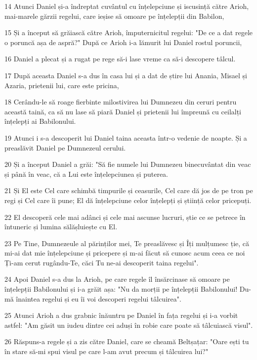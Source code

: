 \par 14 Atunci Daniel și-a îndreptat cuvântul cu înțelepciune și iscusință către Arioh, mai-marele gărzii regelui, care ieșise să omoare pe înțelepții din Babilon,
\par 15 Și a început să grăiască către Arioh, împuternicitul regelui: "De ce a dat regele o poruncă așa de aspră?" După ce Arioh i-a lămurit lui Daniel rostul poruncii,
\par 16 Daniel a plecat și a rugat pe rege să-i lase vreme ca să-i descopere tâlcul.
\par 17 După aceasta Daniel s-a dus în casa lui și a dat de știre lui Anania, Misael și Azaria, prietenii lui, care este pricina,
\par 18 Cerându-le să roage fierbinte milostivirea lui Dumnezeu din ceruri pentru această taină, ca să nu lase să piară Daniel și prietenii lui împreună cu ceilalți înțelepți ai Babilonului.
\par 19 Atunci i s-a descoperit lui Daniel taina aceasta într-o vedenie de noapte. Și a preaslăvit Daniel pe Dumnezeul cerului.
\par 20 Și a început Daniel a grăi: "Să fie numele lui Dumnezeu binecuvântat din veac și până în veac, că a Lui este înțelepciunea și puterea.
\par 21 Și El este Cel care schimbă timpurile și ceasurile, Cel care dă jos de pe tron pe regi și Cel care îi pune; El dă înțelepciune celor înțelepți și știință celor pricepuți.
\par 22 El descoperă cele mai adânci și cele mai ascunse lucruri, știe ce se petrece în întuneric și lumina sălășluiește cu El.
\par 23 Pe Tine, Dumnezeule al părinților mei, Te preaslăvesc și Îți mulțumesc ție, că mi-ai dat mie înțelepciune și pricepere și m-ai făcut să cunosc acum ceea ce noi Ți-am cerut rugându-Te, căci Tu ne-ai descoperit taina regelui".
\par 24 Apoi Daniel s-a dus la Arioh, pe care regele îl însărcinase să omoare pe înțelepții Babilonului și i-a grăit așa: "Nu da morții pe înțelepții Babilonului! Du-mă înaintea regelui și eu îi voi descoperi regelui tâlcuirea".
\par 25 Atunci Arioh a dus grabnic înăuntru pe Daniel în fața regelui și i-a vorbit astfel: "Am găsit un iudeu dintre cei aduși în robie care poate să tâlcuiască visul".
\par 26 Răspuns-a regele și a zis către Daniel, care se cheamă Beltșațar: "Oare ești tu în stare să-mi spui visul pe care l-am avut precum și tâlcuirea lui?"
